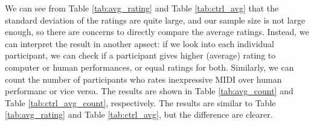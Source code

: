 %

We can see from Table \ref{tab:avg_rating} and Table \ref{tab:ctrl_avg} that the standard deviation of the ratings are quite large, and our sample size is not large enough, so there are concerns to directly compare the average ratings. Instead, we can interpret the result in another apsect: if we look into each individual participant, we can check if a participant gives higher (average) rating to computer or human performances, or equal ratings for both. Similarly, we can count the number of participants who rates inexpressive MIDI over human performanc or vice versa. The results are shown in Table \ref{tab:avg_count} and Table \ref{tab:ctrl_avg_count}, respectively. The results are similar to Table \ref{tab:avg_rating} and Table \ref{tab:ctrl_avg}, but the difference are clearer.

